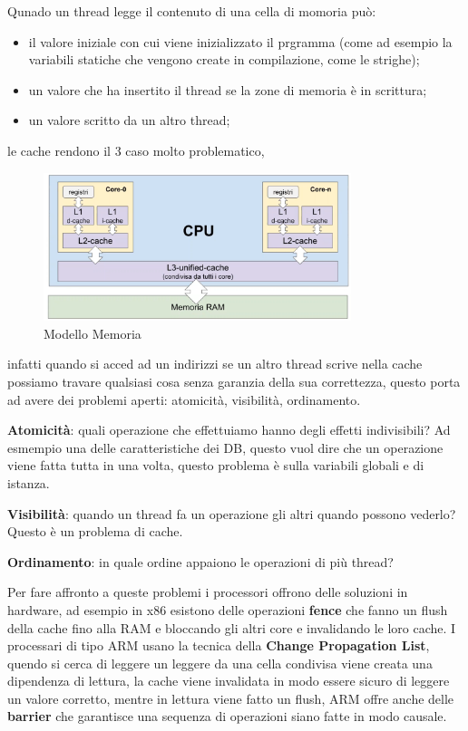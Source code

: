 \documentclass[12pt]{article}
\begin{document}
Qunado un thread legge il contenuto di una cella di momoria pu\`o:
\begin{itemize}
  \item il valore iniziale con cui viene inizializzato il prgramma (come ad esempio la variabili statiche che vengono create in compilazione, come le strighe);
  \item un valore che ha insertito il thread se la zone di memoria \`e in scrittura;
  \item un valore scritto da un altro thread;
\end{itemize}
le cache rendono il 3 caso molto problematico,
\begin{figure}[H]
  \centering
  \includegraphics[width=0.8\textwidth]{modello-memoria.png}
  \caption{Modello Memoria}
  \label{fig:modello-memoria}
\end{figure}
infatti quando si acced ad un indirizzi se un altro thread scrive nella cache possiamo travare qualsiasi cosa senza garanzia della sua correttezza, questo porta ad avere dei problemi aperti: atomicit\`a, visibilit\`a, ordinamento.

\textbf{Atomicit\`a}: quali operazione che effettuiamo hanno degli effetti indivisibili? Ad esmempio una delle caratteristiche dei DB, questo vuol dire che un operazione viene fatta tutta in una volta, questo problema \`e sulla variabili globali e di istanza.

\textbf{Visibilit\`a}: quando un thread fa un operazione gli altri quando possono vederlo? Questo \`e un problema di cache.

\textbf{Ordinamento}: in quale ordine appaiono le operazioni di pi\`u thread?

Per fare affronto a queste problemi i processori offrono delle soluzioni in hardware, ad esempio in x86 esistono delle operazioni \textbf{fence} che fanno un flush della cache fino alla RAM e bloccando gli altri core e invalidando le loro cache. I processari di tipo ARM usano la tecnica della \textbf{Change Propagation List}, quendo si cerca di leggere un leggere da una cella condivisa viene creata una dipendenza di lettura, la cache viene invalidata in modo essere sicuro di leggere un valore corretto, mentre in lettura viene fatto un flush, ARM offre anche delle \textbf{barrier} che garantisce una sequenza di operazioni siano fatte in modo causale.
\end{document}
